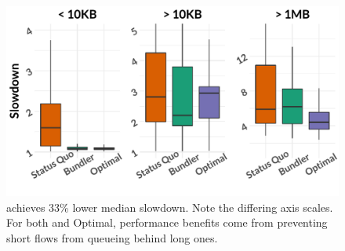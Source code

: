 \begin{figure}
    \centering
\begin{knitrout}
\color{fgcolor}
\includegraphics[width=\maxwidth]{figure/eval:best-1} 

\end{knitrout}
    \caption{\name achieves 33\% lower median slowdown. Note the differing axis scales. For both \name and Optimal, performance benefits come from preventing short flows from queueing behind long ones.}
    \label{fig:eval:best}
\end{figure}
\newcommand{\overviewBenefitsBaselineMedian}{1.62}
\newcommand{\overviewBenefitsBaselineTail}{10.77}
\newcommand{\overviewBenefitsBundlerMedian}{1.08}
\newcommand{\overviewBenefitsBundlerTail}{9.84}
\newcommand{\overviewBenefitsOptimalMedian}{1.08}
\newcommand{\overviewBenefitsOptimalTail}{4.46}
\newcommand{\overviewBenefitsBundlerMedianImprovement}{33.25\%}
